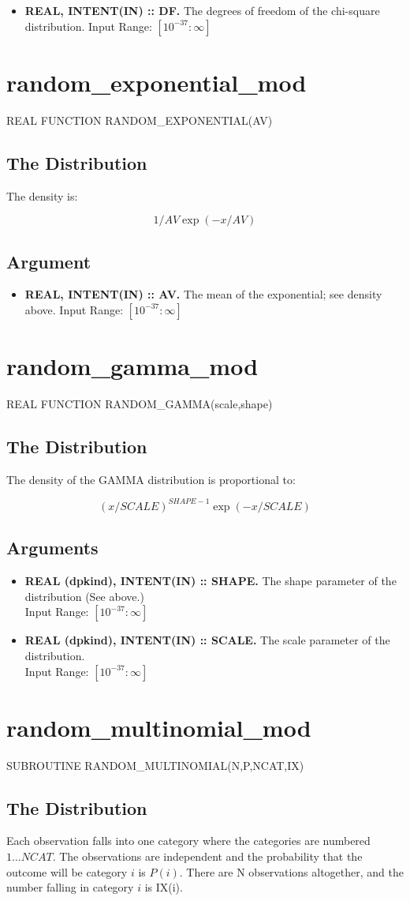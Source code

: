\documentclass[12pt,dvips]{article}
\newcommand{\mysection}[1]{\color{blue}
            \section{#1} \normalcolor}
\newcommand{\mysubsection}[1] {\color{green}
            \subsection{#1} \normalcolor}
\newcommand{\myitem}[1]{\item{\bf \color{Violet} #1 \normalcolor}}
\newcommand{\inrange}[2]{\hfill Input Range: \ensuremath{\left[ #1:#2
\right]}\\}
\newcommand{\rtiny}{10^{-37}}
\begin{document}
\begin{itemize}

\myitem{REAL, INTENT(IN) :: DF.} The degrees of freedom of the
  chi-square distribution.
\inrange{\rtiny}{\infty}

\end{itemize}

\pagebreak

\mysection{random\_exponential\_mod}

      REAL FUNCTION RANDOM\_EXPONENTIAL(AV)

\mysubsection{The Distribution}

The density is:

\[ 1/AV \exp(-x/AV) \]

\mysubsection{Argument}

\begin{itemize}

\myitem{REAL, INTENT(IN) :: AV.} The mean of the exponential; 
see density above.
\inrange{\rtiny}{\infty}

\end{itemize}

\pagebreak

\mysection{random\_gamma\_mod}

REAL FUNCTION RANDOM\_GAMMA(scale,shape)

\mysubsection{The Distribution}

The density of the GAMMA distribution is proportional to:

\[ (x/SCALE)^{SHAPE-1} \exp(-x/SCALE) \]

\mysubsection{Arguments}

\begin{itemize}

\myitem{REAL (dpkind), INTENT(IN) :: SHAPE.}  The shape parameter of the
distribution (See above.)\\
\inrange{\rtiny}{\infty}

\myitem{REAL (dpkind), INTENT(IN) :: SCALE.}  The scale parameter of the
distribution.\\ \inrange{\rtiny}{\infty}

\end{itemize}

\pagebreak

\mysection{random\_multinomial\_mod}

      SUBROUTINE RANDOM\_MULTINOMIAL(N,P,NCAT,IX)

\mysubsection{The Distribution}

Each observation falls into one category where the categories are
numbered $1 \ldots NCAT$.  The observations are independent and the
probability that the outcome will be category $i$ is $P(i)$.  There
are N observations altogether, and the number falling in category $i$
is IX(i).
\end{document}
